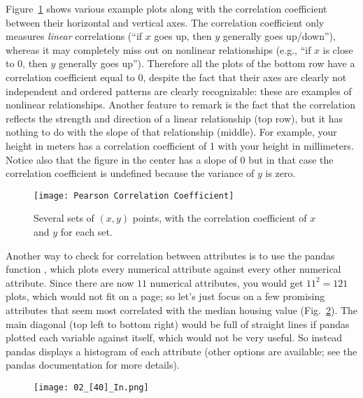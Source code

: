 Figure~\ref{PearsonCorrelationCoefficient} shows various example plots along with the correlation coefficient between their horizontal and vertical axes. The correlation coefficient only measures \emph{linear} correlations (``if $x$ goes up, then $y$ generally goes up/down''), whereas it may completely miss out on nonlinear relationships (e.g., ``if $x$ is close to 0, then $y$ generally goes up''). Therefore all the plots of the bottom row have a correlation coefficient equal to 0, despite the fact that their axes are clearly not independent and ordered patterns are clearly recognizable: these are examples of nonlinear relationships. Another feature to remark is the fact that the correlation reflects the strength and direction of a linear relationship (top row), but it has nothing to do with the slope of that relationship (middle). For example, your height in meters has a correlation coefficient of 1 with your height in millimeters. Notice also that the figure in the center has a slope of 0 but in that case the correlation coefficient is undefined because the variance of $y$ is zero.
\begin{figure}[h!t]
\centering
\texttt{[image: Pearson Correlation Coefficient]}
\caption{Several sets of $(x,y)$ points, with the correlation coefficient of $x$ and $y$ for each set.}\label{PearsonCorrelationCoefficient}
\end{figure}

Another way to check for correlation between attributes is to use the pandas function , which plots every numerical attribute against every other numerical attribute. Since there are now $11$ numerical attributes, you would get ${11}^2=121$ plots, which would not fit on a page; so let's just focus on a few promising attributes that seem most correlated with the median housing value (Fig.~\ref{02_[40]_In}). The main diagonal (top left to bottom right) would be full of straight lines if pandas plotted each variable against itself, which would not be very useful. So instead pandas displays a histogram of each attribute (other options are available; see the pandas documentation for more details).
\begin{figure}[h!t]
\centering
\texttt{[image: 02\_[40]\_In.png]}
\caption{}\label{02_[40]_In}
\end{figure}

